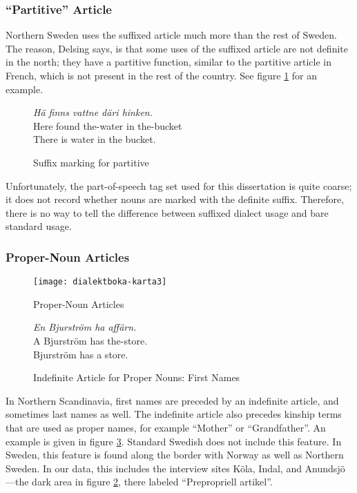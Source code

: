 \subsubsection{``Partitive'' Article}

Northern Sweden uses the suffixed article much more than the rest of
Sweden. The reason, Delsing says, is that some uses of the suffixed
article are not definite in the north; they have a partitive function,
similar to the partitive article in French, which is not present in
the rest of the country. See figure \ref{partitive-article} for an
example.


\begin{figure}
  {\it H\"a finns vattne d\"ari hinken.} \\
  Here found the-water in the-bucket \\
  There is water in the bucket. \\
  \caption{Suffix marking for partitive}
  \label{partitive-article}
\end{figure}

Unfortunately, the part-of-speech tag set used for this dissertation
is quite coarse; it does not record whether nouns are marked with the
definite suffix. Therefore, there is no way to tell the difference
between suffixed dialect usage and bare standard usage.

\subsubsection{Proper-Noun Articles}

\begin{figure}
  \texttt{[image: dialektboka-karta3]}
  \caption{Proper-Noun Articles}
  \label{indefinite-article-proper-noun-map}
\end{figure}

\begin{figure}
  {\it En Bjurstr\"om ha aff\"arn.} \\
  A Bjurstr\"om has the-store. \\
  Bjurstr\"om has a store. \\
  \caption{Indefinite Article for Proper Nouns: First Names}
  \label{indefinite-article-proper-noun}
\end{figure}

In Northern Scandinavia, first names are preceded by an indefinite
article, and sometimes last names as well. The indefinite article also
precedes kinship terms that are used as proper names, for example
``Mother'' or ``Grandfather''. An example is given in figure
\ref{indefinite-article-proper-noun}. Standard Swedish does not
include this feature. In Sweden, this feature is found along the
border with Norway as well as Northern Sweden. In our data, this
includes the interview sites K\"ola, Indal, and Anundsj\"o---the dark
area in figure \ref{indefinite-article-proper-noun-map}, there labeled
``Prepropriell artikel''.

